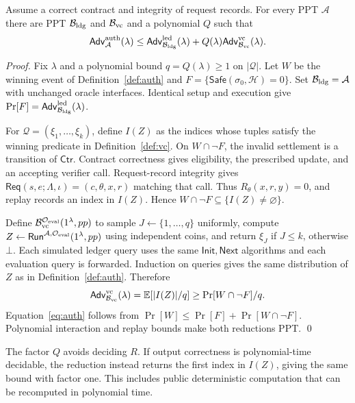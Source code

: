 \documentclass[runningheads,orivec]{llncs}
\newcommand{\Req}{\mathsf{Req}}
\newcommand{\Init}{\mathsf{Init}}
\newcommand{\Next}{\mathsf{Next}}
\newcommand{\Run}{\mathsf{Run}}
\newcommand{\Safe}{\mathsf{Safe}}
\newcommand{\Ctr}{\mathsf{Ctr}}
\newcommand{\Adv}{\mathsf{Adv}}
\newcommand{\EvalO}{\mathcal O_{\rm eval}}
\begin{document}
\begin{theorem}\label{thm:auth}
Assume a correct contract and integrity of request records. For every PPT $\mathcal A$ there are PPT $\mathcal B_{\rm ldg}$ and $\mathcal B_{\rm vc}$ and a polynomial $Q$ such that
\begin{equation}\label{eq:auth}
 \Adv^{\rm auth}_{\mathcal A}(\lambda)
 \leq \Adv^{\rm led}_{\mathcal B_{\rm ldg}}(\lambda)
      +Q(\lambda)\Adv^{\rm vc}_{\mathcal B_{\rm vc}}(\lambda).
\end{equation}
\end{theorem}
\begin{proof}
Fix $\lambda$ and a polynomial bound $q=Q(\lambda)\geq1$ on $|\mathcal Q|$. Let $W$ be the winning event of Definition~\ref{def:auth} and $F=\{\Safe(\sigma_0,\mathcal H)=0\}$. Set $\mathcal B_{\rm ldg}=\mathcal A$ with unchanged oracle interfaces. Identical setup and execution give $\Pr[F]=\Adv^{\rm led}_{\mathcal B_{\rm ldg}}(\lambda)$.

For $\mathcal Q=(\xi_1,\ldots,\xi_k)$, define $I(Z)$ as the indices whose tuples satisfy the winning predicate in Definition~\ref{def:vc}. On $W\cap\neg F$, the invalid settlement is a transition of $\Ctr$. Contract correctness gives eligibility, the prescribed update, and an accepting verifier call. Request-record integrity gives $\Req(s,e;\Lambda,\iota)=(c,\theta,x,r)$ matching that call. Thus $R_\theta(x,r,y)=0$, and replay records an index in $I(Z)$. Hence $W\cap\neg F\subseteq\{I(Z)\ne\varnothing\}$.

Define $\mathcal B_{\rm vc}^{\EvalO}(1^\lambda,pp)$ to sample $J\gets\{1,\ldots,q\}$ uniformly, compute $Z\leftarrow\Run^{\mathcal A,\EvalO}(1^\lambda,pp)$ using independent coins, and return $\xi_J$ if $J\leq k$, otherwise $\bot$. Each simulated ledger query uses the same $\Init,\Next$ algorithms and each evaluation query is forwarded. Induction on queries gives the same distribution of $Z$ as in Definition~\ref{def:auth}. Therefore
\[
 \Adv^{\rm vc}_{\mathcal B_{\rm vc}}(\lambda)
 =\mathbb E[|I(Z)|/q]\geq\Pr[W\cap\neg F]/q.
\]
Equation~\eqref{eq:auth} follows from $\Pr[W]\leq\Pr[F]+\Pr[W\cap\neg F]$. Polynomial interaction and replay bounds make both reductions PPT. \qed
\end{proof}
The factor $Q$ avoids deciding $R$. If output correctness is polynomial-time decidable, the reduction instead returns the first index in $I(Z)$, giving the same bound with factor one. This includes public deterministic computation that can be recomputed in polynomial time.
\end{document}
